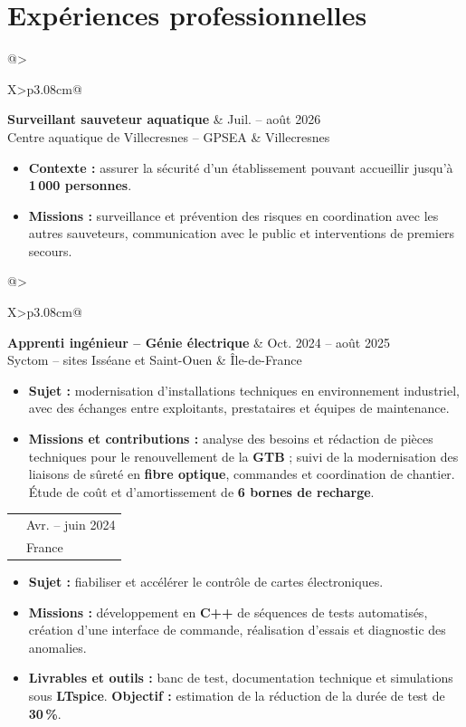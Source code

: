 \documentclass[9pt,a4paper]{extarticle}
\makeatletter
\newcommand{\entry}[4]{%
\begin{tabularx}{\linewidth}{@{}>{\raggedright\arraybackslash}X>{\raggedleft\arraybackslash}p{3.08cm}@{}}
 {\bfseries\color{bleu}#1} & {\fontsize{8.5}{9.3}\selectfont\color{secondaire}#2} \\[-2pt]
 {\fontsize{8.5}{9.6}\selectfont\color{secondaire}#3} & {\fontsize{8.5}{9.3}\selectfont\color{secondaire}#4}
\end{tabularx}\vspace{-3.4pt}\par}
\newcommand{\gapentry}{\vspace{3.0pt}}
\makeatother
\begin{document}
\section{Expériences professionnelles}
\entry{Surveillant sauveteur aquatique}{Juil. -- août 2026}{Centre aquatique de Villecresnes -- GPSEA}{Villecresnes}
\begin{itemize}
  \item \textbf{Contexte :} assurer la sécurité d'un établissement pouvant accueillir jusqu'à \textbf{1\,000 personnes}.
  \item \textbf{Missions :} surveillance et prévention des risques en coordination avec les autres sauveteurs, communication avec le public et interventions de premiers secours.
\end{itemize}
\gapentry
\entry{Apprenti ingénieur -- Génie électrique}{Oct. 2024 -- août 2025}{Syctom -- sites Isséane et Saint-Ouen}{Île-de-France}
\begin{itemize}
  \item \textbf{Sujet :} modernisation d'installations techniques en environnement industriel, avec des échanges entre exploitants, prestataires et équipes de maintenance.
  \item \textbf{Missions et contributions :} analyse des besoins et rédaction de pièces techniques pour le renouvellement de la \textbf{GTB} ; suivi de la modernisation des liaisons de sûreté en \textbf{fibre optique}, commandes et coordination de chantier. Étude de coût et d'amortissement de \textbf{6 bornes de recharge}.
\end{itemize}
\gapentry
\entry{Stagiaire technicien électronicien supérieur}{Avr. -- juin 2024}{Cobham Aerospace Communications}{France}
\begin{itemize}
  \item \textbf{Sujet :} fiabiliser et accélérer le contrôle de cartes électroniques.
  \item \textbf{Missions :} développement en \textbf{C++} de séquences de tests automatisés, création d'une interface de commande, réalisation d'essais et diagnostic des anomalies.
  \item \textbf{Livrables et outils :} banc de test, documentation technique et simulations sous \textbf{LTspice}. \textbf{Objectif :} estimation de la réduction de la durée de test de \textbf{30\,\%}.
\end{itemize}
\end{document}
